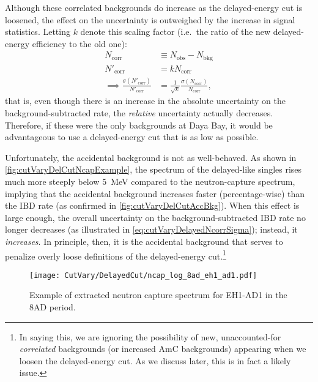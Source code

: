 \documentclass[../thesis.tex]{subfiles}
\begin{document}
Although these correlated backgrounds do increase as the delayed-energy cut is loosened, the effect on the uncertainty is outweighed by the increase in signal statistics. Letting $k$ denote this scaling factor (i.e.\ the ratio of the new delayed-energy efficiency to the old one):
\begin{align}
  \label{eq:cutVaryDelayedNcorrSigma}
  N_{\mathrm{corr}} &\equiv N_{\mathrm{obs}} - N_{\mathrm{bkg}} \\
  N'_{\mathrm{corr}} &= k N_{\mathrm{corr}} \\
  \implies \frac{\sigma(N'_{\mathrm{corr}})}{N'_{\mathrm{corr}}} &= \frac{1}{\sqrt{k}} \frac{\sigma(N_{\mathrm{corr}})}{N_{\mathrm{corr}}},
\end{align}
that is, even though there is an increase in the absolute uncertainty on the background-subtracted rate, the \emph{relative} uncertainty actually decreases. Therefore, if these were the only backgrounds at Daya Bay, it would be advantageous to use a delayed-energy cut that is as low as possible.

Unfortunately, the accidental background is not as well-behaved. As shown in \autoref{fig:cutVaryDelCutNcapExample}, the spectrum of the delayed-like singles rises much more steeply below 5~MeV compared to the neutron-capture spectrum, implying that the accidental background increases faster (percentage-wise) than the IBD rate (as confirmed in \autoref{fig:cutVaryDelCutAccBkg}). When this effect is large enough, the overall uncertainty on the background-subtracted IBD rate no longer decreases (as illustrated in \autoref{eq:cutVaryDelayedNcorrSigma}); instead, it \emph{increases}. In principle, then, it is the accidental background that serves to penalize overly loose definitions of the delayed-energy cut.\footnote{In saying this, we are ignoring the possibility of new, unaccounted-for \emph{correlated} backgrounds (or increased AmC backgrounds) appearing when we loosen the delayed-energy cut. As we discuss later, this is in fact a likely issue.}

\begin{figure}[ht]
  \texttt{[image: CutVary/DelayedCut/ncap\_log\_8ad\_eh1\_ad1.pdf]}
  \caption{Example of extracted neutron capture spectrum for EH1-AD1 in the 8AD period.}
  \label{fig:cutVaryDelCutNcapExample}
\end{figure}

\end{document}
